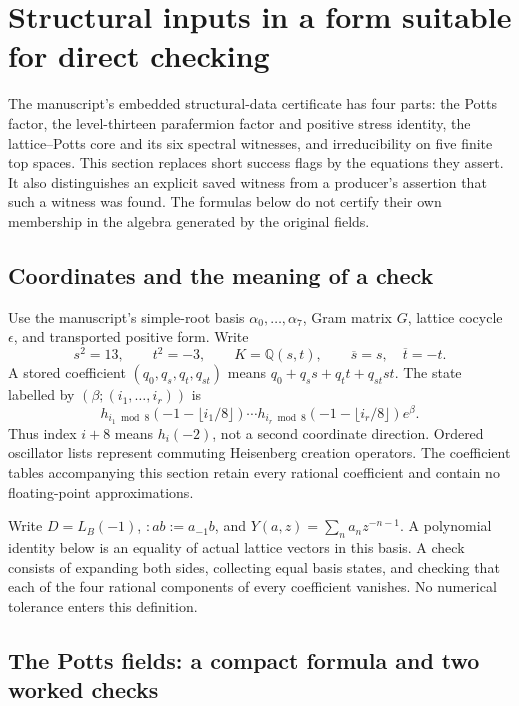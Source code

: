 \section{Structural inputs in a form suitable for direct checking}
\label{hr:structural-inputs}

The manuscript's embedded structural-data certificate has four parts:
the Potts factor, the level-thirteen parafermion factor and positive
stress identity, the lattice--Potts core and its six spectral witnesses,
and irreducibility on five finite top spaces. This section replaces
short success flags by the equations they assert. It also distinguishes
an explicit saved witness from a producer's assertion that such a
witness was found. The formulas below do not certify their own
membership in the algebra generated by the original fields.

\subsection{Coordinates and the meaning of a check}

Use the manuscript's simple-root basis $\alpha_0,\ldots,\alpha_7$,
Gram matrix $G$, lattice cocycle $\epsilon$, and transported positive
form. Write
\[
 s^2=13,\qquad t^2=-3,\qquad
 K=\mathbb Q(s,t),\qquad
 \overline{s}=s,\quad\overline{t}=-t.
\]
A stored coefficient $(q_0,q_s,q_t,q_{st})$ means
$q_0+q_ss+q_tt+q_{st}st$. The state labelled by
$(\beta;(i_1,\ldots,i_r))$ is
\[
 h_{i_1\bmod8}(-1-\lfloor i_1/8\rfloor)\cdots
 h_{i_r\bmod8}(-1-\lfloor i_r/8\rfloor)e^\beta.
\]
Thus index $i+8$ means $h_i(-2)$, not a second coordinate
direction. Ordered oscillator lists represent commuting Heisenberg
creation operators. The coefficient tables accompanying this section
retain every rational coefficient and contain no floating-point
approximations.

Write $D=L_B(-1)$, $:ab:=a_{-1}b$, and
$Y(a,z)=\sum_n a_nz^{-n-1}$. A polynomial identity below is an
equality of actual lattice vectors in this basis. A check consists of
expanding both sides, collecting equal basis states, and checking that
each of the four rational components of every coefficient vanishes.
No numerical tolerance enters this definition.

\subsection{The Potts fields: a compact formula and two worked checks}

